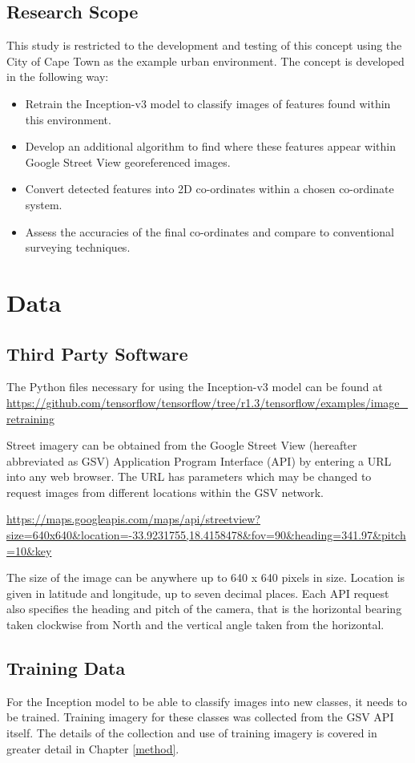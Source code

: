 \subsection{Research Scope}
This study is restricted to the development and testing of this concept using the City of Cape Town as the example urban environment.
The concept is developed in the following way:
\begin{itemize}
\item Retrain the Inception-v3 model to classify images of features found within this environment.
\item Develop an additional algorithm to find where these features appear within Google Street View georeferenced images.
\item Convert detected features into 2D co-ordinates within a chosen co-ordinate system.
\item Assess the accuracies of the final co-ordinates and compare to conventional surveying techniques.
\end{itemize}

\section{Data}

\subsection{Third Party Software}
The Python files necessary for using the Inception-v3 model can be found at \url{https://github.com/tensorflow/tensorflow/tree/r1.3/tensorflow/examples/image_retraining}

Street imagery can be obtained from the Google Street View (hereafter abbreviated as GSV) Application Program Interface (API) by entering a URL into any web browser. The URL has parameters which may be changed to request images from different locations within the GSV network. 

\url{https://maps.googleapis.com/maps/api/streetview?size=640x640&location=-33.9231755,18.4158478&fov=90&heading=341.97&pitch=10&key}

The size of the image can be anywhere up to 640 x 640 pixels in size. Location is given in latitude and longitude, up to seven decimal places. Each API request also specifies the heading and pitch of the camera, that is the horizontal bearing taken clockwise from North and the vertical angle taken from the horizontal.

\subsection{Training Data}
For the Inception model to be able to classify images into new classes, it needs to be trained. Training imagery for these classes was collected from the GSV API itself. The details of the collection and use of training imagery is covered in greater detail in Chapter \ref{method}.

 